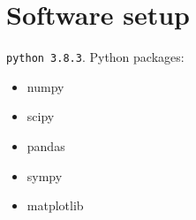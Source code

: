 \documentclass[a4paper]{article}
\begin{document}
\thispagestyle{empty}

\newpage

\tableofcontents
\newpage

\section{Software setup}%
\label{sec:software_setup}

\texttt{python 3.8.3}.
Python packages:
\begin{itemize}
	\item numpy
	\item scipy
	\item pandas
	\item sympy
	\item matplotlib
\end{itemize}

%

\end{document}
